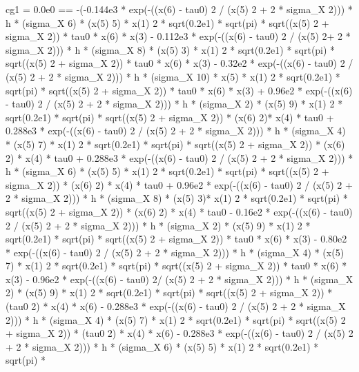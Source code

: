 \begin{maplegroup}
cg1 = 0.0e0 == -(-0.144e3 * exp(-((x(6) - tau0)  2 / (x(5)  2 + 2 * sigma\_X  2))) * h * (sigma\_X  6) * (x(5)  5) * x(1)  2 * sqrt(0.2e1) * sqrt(pi) * sqrt((x(5)  2 + sigma\_X  2)) * tau0 * x(6) * x(3) - 0.112e3 * exp(-((x(6) - tau0)  2 / (x(5)  2+ 2 * sigma\_X  2))) * h * (sigma\_X  8) * (x(5)  3) * x(1)  2 * sqrt(0.2e1) * sqrt(pi) * sqrt((x(5)  2 + sigma\_X  2)) * tau0 * x(6) * x(3) - 0.32e2 * exp(-((x(6) - tau0)  2 / (x(5)  2 + 2 * sigma\_X  2))) * h * (sigma\_X  10) * x(5) * x(1)  2 * sqrt(0.2e1) * sqrt(pi) * sqrt((x(5)  2 + sigma\_X  2)) * tau0 * x(6) * x(3) + 0.96e2 * exp(-((x(6) - tau0)  2 / (x(5)  2 + 2 * sigma\_X  2))) * h * (sigma\_X  2) * (x(5)  9) * x(1)  2 * sqrt(0.2e1) * sqrt(pi) * sqrt((x(5)  2 + sigma\_X  2)) * (x(6)  2)* x(4) * tau0 + 0.288e3 * exp(-((x(6) - tau0)  2 / (x(5)  2 + 2 * sigma\_X  2))) * h * (sigma\_X  4) * (x(5)  7) * x(1)  2 * sqrt(0.2e1) * sqrt(pi) * sqrt((x(5)  2 + sigma\_X  2)) * (x(6)  2) * x(4) * tau0 + 0.288e3 * exp(-((x(6) - tau0)  2 / (x(5) 2 + 2 * sigma\_X  2))) * h * (sigma\_X  6) * (x(5)  5) * x(1)  2 * sqrt(0.2e1) * sqrt(pi) * sqrt((x(5)  2 + sigma\_X  2)) * (x(6)  2) * x(4) * tau0 + 0.96e2 * exp(-((x(6) - tau0)  2 / (x(5)  2 + 2 * sigma\_X  2))) * h * (sigma\_X  8) * (x(5)  3)* x(1)  2 * sqrt(0.2e1) * sqrt(pi) * sqrt((x(5)  2 + sigma\_X  2)) * (x(6)  2) * x(4) * tau0 - 0.16e2 * exp(-((x(6) - tau0)  2 / (x(5)  2 + 2 * sigma\_X  2))) * h * (sigma\_X  2) * (x(5)  9) * x(1)  2 * sqrt(0.2e1) * sqrt(pi) * sqrt((x(5)  2 + sigma\_X  2)) * tau0 * x(6) * x(3) - 0.80e2 * exp(-((x(6) - tau0)  2 / (x(5)  2 + 2 * sigma\_X  2))) * h * (sigma\_X  4) * (x(5)  7) * x(1)  2 * sqrt(0.2e1) * sqrt(pi) * sqrt((x(5)  2 + sigma\_X  2)) * tau0 * x(6) * x(3) - 0.96e2 * exp(-((x(6) - tau0)  2/ (x(5)  2 + 2 * sigma\_X  2))) * h * (sigma\_X  2) * (x(5)  9) * x(1)  2 * sqrt(0.2e1) * sqrt(pi) * sqrt((x(5)  2 + sigma\_X  2)) * (tau0  2) * x(4) * x(6) - 0.288e3 * exp(-((x(6) - tau0)  2 / (x(5)  2 + 2 * sigma\_X  2))) * h * (sigma\_X  4) * (x(5)  7) * x(1)  2 * sqrt(0.2e1) * sqrt(pi) * sqrt((x(5)  2 + sigma\_X  2)) * (tau0  2) * x(4) * x(6) - 0.288e3 * exp(-((x(6) - tau0)  2 / (x(5)  2 + 2 * sigma\_X  2))) * h * (sigma\_X  6) * (x(5)  5) * x(1)  2 * sqrt(0.2e1) * sqrt(pi) * 
\end{maplegroup}
